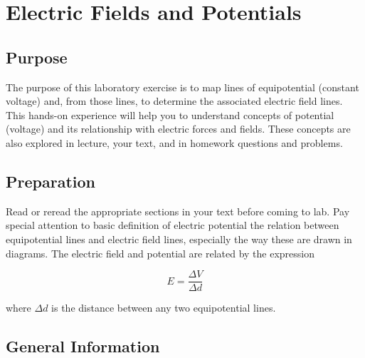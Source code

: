 
\chapter{Electric Fields and Potentials}

\begin{multicols}{2}
\section{Purpose}
The purpose of this laboratory exercise is to map lines of equipotential (constant voltage) and, from those lines, to determine the associated electric field lines. This hands-on experience will help you to understand concepts of potential (voltage) and its relationship with electric forces and fields.  These concepts are also explored in lecture, your text, and in homework questions and problems.
\section{Preparation}
Read or reread the appropriate sections in your text before coming to lab. Pay special attention to basic definition of electric potential the relation between equipotential lines and electric field lines, especially the way these are drawn in diagrams. The electric field and potential are related by the expression

\begin{equation} \label{e:EandV} E  = \frac{\Delta V}{\Delta d} \end{equation}

\noindent where $\Delta d$ is the distance between any two equipotential lines.


\section{General Information}


\end{multicols}
